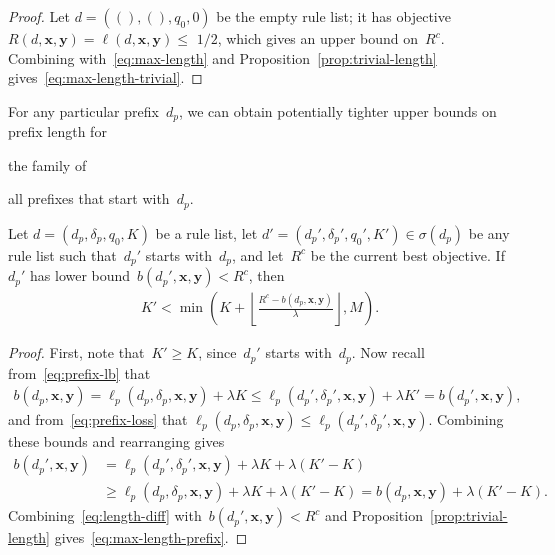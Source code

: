 \documentclass[twoside,11pt]{article}
\newcommand{\x}{\mathbf{x}}
\newcommand{\y}{\mathbf{y}}
\def\RL{{d}}
\def\Prefix{d_p}
\def\Labels{\delta_p}
\def\Default{q_0}
\def\Obj{R}
\def\Loss{\ell}
\def\Reg{{\lambda}}
\def\CurrentObj{{R^c}}
\def\StartsWith{\sigma}
\newcommand{\nn}{\nonumber}
\begin{document}
\begin{arxiv}
\begin{proof}
Let ${d = ((), (), q_0, 0)}$ be the empty rule list;
it has objective ${\Obj(\RL, \x, \y) = \Loss(\RL, \x, \y) \le}$ ${1/2}$,
which gives an upper bound on~$\CurrentObj$.
%
Combining with~\eqref{eq:max-length}
and Proposition~\ref{prop:trivial-length}
gives~\eqref{eq:max-length-trivial}.
\end{proof}
\end{arxiv}

For any particular prefix~$\Prefix$, we can obtain potentially tighter
upper bounds on prefix length for
\begin{arxiv}
the family of
\end{arxiv}
all prefixes that start with~$\Prefix$.

\begin{theorem}
\label{thm:ub-prefix-specific}
Let ${\RL = (\Prefix, \Labels, \Default, K)}$ be a rule list, let
${\RL' = (\Prefix', \Labels', \Default', K') \in \StartsWith(\Prefix)}$
be any rule list such that~$\Prefix'$ starts with~$\Prefix$,
and let~$\CurrentObj$ be the current best objective.
%
If~$\Prefix'$ has lower bound~${b(\Prefix', \x, \y) < \CurrentObj}$, then
\begin{align}
K' < \min \left( K + \left\lfloor \frac{\CurrentObj - b(\Prefix, \x, \y)}{\Reg} \right\rfloor, M \right).
\label{eq:max-length-prefix}
\end{align}
\end{theorem}

\begin{arxiv}
\begin{proof}
First, note that~${K' \ge K}$, since~$\Prefix'$ starts with~$\Prefix$.
%
Now recall from~\eqref{eq:prefix-lb} that
%
\begin{align}
b(\Prefix, \x, \y) = \Loss_p(\Prefix, \Labels, \x, \y) + \Reg K
\le \Loss_p(\Prefix', \Labels', \x, \y) + \Reg K' = b(\Prefix', \x, \y), \nn
\end{align}
%
and from~\eqref{eq:prefix-loss} that
${\Loss_p(\Prefix, \Labels, \x, \y) \le \Loss_p(\Prefix', \Labels', \x, \y)}$.
%
Combining these bounds and rearranging gives
\begin{align}
b(\Prefix', \x, \y) &= \Loss_p(\Prefix', \Labels', \x, \y) + \Reg K + \Reg(K' - K) \nn \\
&\ge \Loss_p(\Prefix, \Labels, \x, \y) + \Reg K + \Reg(K' - K)
= b(\Prefix, \x, \y) + \Reg (K' - K).
\label{eq:length-diff}
\end{align}
Combining~\eqref{eq:length-diff} with~${b(\Prefix', \x, \y) < \CurrentObj}$
and Proposition~\ref{prop:trivial-length} gives~\eqref{eq:max-length-prefix}.
\end{proof}
\end{arxiv}
\end{document}
